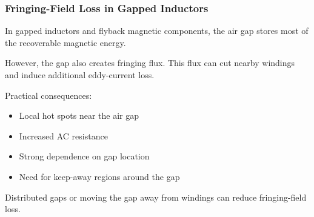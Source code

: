 \begin{frame}
    \frametitle{Fringing-Field Loss in Gapped Inductors}
            In gapped inductors and flyback magnetic components, the air gap stores most of the recoverable magnetic energy.

            \vspace{0.15cm}

            However, the gap also creates fringing flux. This flux can cut nearby windings and induce additional eddy-current loss.

            \vspace{0.15cm}

            Practical consequences:
            \begin{itemize}
                \item Local hot spots near the air gap
                \item Increased AC resistance
                \item Strong dependence on gap location
                \item Need for keep-away regions around the gap
            \end{itemize}

            \vspace{0.15cm}

            Distributed gaps or moving the gap away from windings can reduce fringing-field loss.

\end{frame}

